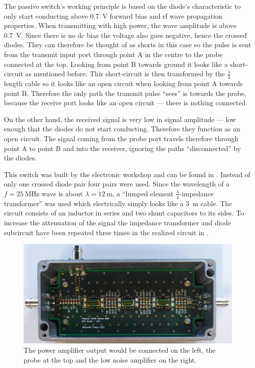 The passive switch's working principle is based on the diode's characteristic to only start conducting above \qty{0.7}{\volt} forward bias and \acrshort{rf} wave propagation properties. When transmitting with high power, the wave amplitude is above \qty{0.7}{\volt}. Since there is no \acrshort{dc} bias the voltage also goes negative, hence the crossed diodes. They can therefore be thought of as shorts in this case so the pulse is sent from the transmit input port through point A in the centre to the probe connected at the top. Looking from point B towards ground it looks like a short-circuit as mentioned before. This short-circuit is then transformed by the \(\frac{\lambda}{4}\) length cable so it looks like an open circuit when looking from point A towards point B. Therefore the only path the transmit pulse \enquote{sees} is towards the probe, because the receive port looks like an open circuit --- there is nothing connected.

On the other hand, the received signal is very low in signal amplitude --- low enough that the diodes do not start conducting. Therefore they function as an open circuit. The signal coming from the probe port travels therefore through point A to point B and into the receiver, ignoring the paths \enquote{disconnected} by the diodes.

This switch was built by the electronic workshop and can be found in . Instead of only one crossed diode pair four pairs were used. Since the wavelength of a \(f = \qty{25}{\mega\hertz}\) wave is about \(\lambda{} = \qty{12}{\metre}\), a \enquote{lumped element \(\frac{\lambda}{4}\)-impedance transformer} was used which electrically simply looks like a \qty{3}{\metre} cable. The circuit consists of an inductor in series and two shunt capacitors to its sides. To increase the attenuation of the signal the impedance transformer and diode subcircuit have been repeated three times in the realized circuit in .

\begin{figure}[hbt]
    \centering
    \includegraphics[width=\textwidth]{images/passive_tr_switch_assembled.jpg}
    \caption{ The power amplifier output would be connected on the left, the probe at the top and the low noise amplifier on the right.}
\end{figure}


